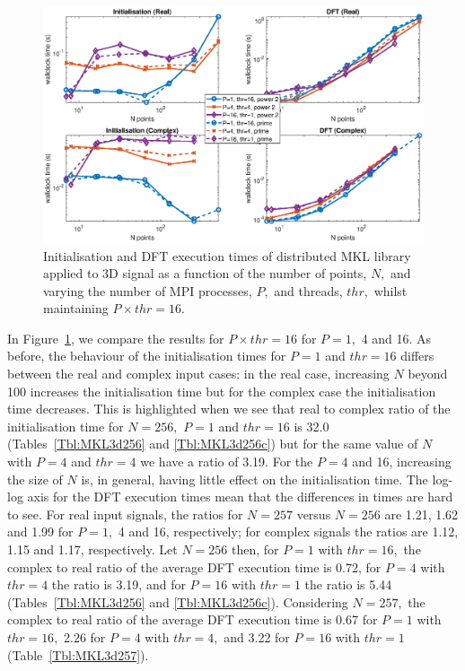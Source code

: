 \documentclass[a4paper]{article}
\begin{document}
\begin{figure}[htb]
    \centering
    \includegraphics[width=0.9\linewidth]{../results/mkl_3d_mpi_thr.eps}
  \caption{Initialisation and DFT execution times of distributed MKL library applied to 3D signal as a function of the
    number of points, $N,$ and varying the number of MPI processes, $P,$ and threads, $thr,$ whilst maintaining $P\times thr=16.$}
  \label{3DDistMKL16}
\end{figure}

In Figure~\ref{3DDistMKL16}, we compare the results for
$P\times thr=16$ for $P=1,$ 4 and 16. As before, the behaviour of the
initialisation times for $P=1$ and $thr=16$ differs between the real
and complex input cases: in the real case, increasing $N$ beyond 100
increases the initialisation time but for the complex case the
initialisation time decreases. This is highlighted when we see that
real to complex ratio of the initialisation time for $N=256,$ $P=1$
and $thr=16$ is 32.0 (Tables~\ref{Tbl:MKL3d256} and
\ref{Tbl:MKL3d256c}) but for the same value of $N$ with $P=4$ and
$thr=4$ we have a ratio of 3.19. For the $P=4$ and 16, increasing the
size of $N$ is, in general, having little effect on the initialisation
time. The log-log axis for the DFT execution times mean that the
differences in times are hard to see. For real input signals, the
ratios for $N=257$ versus $N=256$ are 1.21, 1.62 and 1.99 for $P=1,$ 4
and 16, respectively; for complex signals the ratios are 1.12, 1.15
and 1.17, respectively. Let $N=256$ then, for $P=1$ with $thr=16,$ the
complex to real ratio of the average DFT execution time is 0.72, for
$P=4$ with $thr=4$ the ratio is 3.19, and for $P=16$ with $thr=1$ the
ratio is 5.44 (Tables~\ref{Tbl:MKL3d256} and
\ref{Tbl:MKL3d256c}). Considering $N=257,$ the complex to real ratio
of the average DFT execution time is 0.67 for $P=1$ with $thr=16,$
2.26 for $P=4$ with $thr=4,$ and 3.22 for $P=16$ with $thr=1$
(Table~\ref{Tbl:MKL3d257}).
\end{document}
